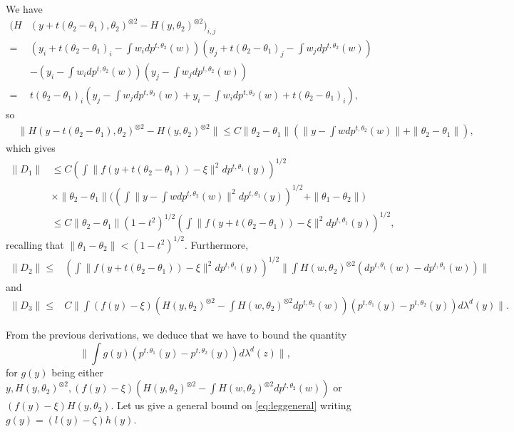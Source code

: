 \documentclass{article}
\begin{document}
We have
\begin{align*}
    \Big(  H&(y+t(\theta_2-\theta_1),\theta_2)^{\otimes 2} - H(y,\theta_2)^{\otimes 2}\Big)_{i,j}\\
     =&\left(y_i+t(\theta_2-\theta_1)_i-\int w_i dp^{t,\theta_2}(w)\right)\left(y_j+t(\theta_2-\theta_1)_j-\int w_j dp^{t,\theta_2}(w)\right)\\
    & - \left(y_i-\int w_i dp^{t,\theta_2}(w)\right)\left(y_j-\int w_j dp^{t,\theta_2}(w)\right)\\
     = &t(\theta_2-\theta_1)_i\left(y_j-\int w_j dp^{t,\theta_2}(w)+y_i-\int w_i dp^{t,\theta_2}(w)+t(\theta_2-\theta_1)_i\right),
\end{align*}
so 
\begin{align}\label{align:H2lipplust}
    &\|H(y-t(\theta_2-\theta_1),\theta_2)^{\otimes 2} - H(y,\theta_2)^{\otimes 2}\|\leq C\|\theta_2-\theta_1\|\left(\|y-\int w dp^{t,\theta_2}(w)\|+\|\theta_2-\theta_1\|\right),
\end{align}
which gives 
\begin{align}\label{align:D1}
    \|D_1\|&\leq C\left(\int \|f(y+t(\theta_2-\theta_1))-\xi\|^2dp^{t,\theta_1}(y)\right)^{1/2}\nonumber\\
    &\times \|\theta_2-\theta_1\|\Biggl(\left(\int \|y-\int w dp^{t,\theta_2}(w)\|^2dp^{t,\theta_1}(y)\right)^{1/2}+ \|\theta_1-\theta_2\|\Biggl)\nonumber\\
    &\leq C\|\theta_2-\theta_1\|(1-t^2)^{1/2}\left(\int \|f(y+t(\theta_2-\theta_1))-\xi\|^2dp^{t,\theta_1}(y)\right)^{1/2},
\end{align}
recalling that $\|\theta_1-\theta_2\|<(1-t^2)^{1/2}$.
Furthermore,
\begin{align}\label{align:D2}
    \|D_2\|
    \leq & \left(\int \|f(y+t(\theta_2-\theta_1))-\xi\|^2dp^{t,\theta_1}(y)\right)^{1/2}\|\int H(w,\theta_2)^{\otimes 2}(dp^{t,\theta_1}(w)- dp^{t,\theta_1}(w))\|
\end{align}
and
\begin{align}\label{align:D3}
    \|D_3\|\leq &C \|\int (f(y)-\xi)\left(H(y,\theta_2)^{\otimes 2}-\int H(w,\theta_2)^{\otimes 2} dp^{t,\theta_2}(w)\right)(p^{t,\theta_1}(y)-p^{t,\theta_2}(y))d\lambda^d(y)\|.
\end{align}

From the previous derivations, we deduce that we have to bound the quantity
\begin{equation}\label{eq:leggeneral}
\|\int g(y) (p^{t,\theta_1}(y)-p^{t,\theta_2}(y))d\lambda^d(z)\|,
\end{equation}
for $g(y)$ being either $y,H(y,\theta_2)^{\otimes 2},(f(y)-\xi)\left(H(y,\theta_2)^{\otimes 2}-\int H(w,\theta_2)^{\otimes 2} dp^{t,\theta_2}(w)\right)$ or $(f(y)-\xi)H(y,\theta_2)$.
Let us give a general bound on \eqref{eq:leggeneral} writing $g(y)=(l(y)-\zeta)h(y)$.
\end{document}

